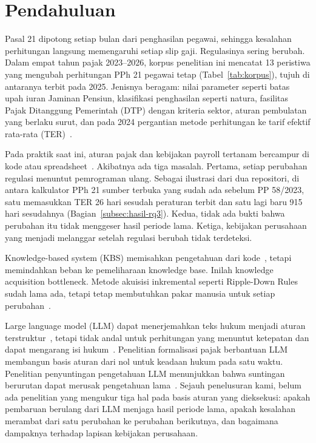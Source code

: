 \documentclass[journal,a4paper]{IEEEtran}
\makeatletter
\DeclareRobustCommand{\en}[1]{{\usefont{\f@encoding}{\f@family}{\f@series}{it}#1\/}}
\makeatother
\begin{document}
\section{Pendahuluan}
\label{sec:pendahuluan}
 Pasal 21 dipotong setiap bulan dari penghasilan pegawai, sehingga kesalahan perhitungan langsung memengaruhi setiap slip gaji. Regulasinya sering berubah. Dalam empat tahun pajak 2023--2026, korpus penelitian ini mencatat 13 peristiwa yang mengubah perhitungan PPh 21 pegawai tetap (Tabel~\ref{tab:korpus}), tujuh di antaranya terbit pada 2025. Jenisnya beragam: nilai parameter seperti batas upah iuran Jaminan Pensiun, klasifikasi penghasilan seperti natura, fasilitas Pajak Ditanggung Pemerintah (DTP) dengan kriteria sektor, aturan pembulatan yang berlaku surut, dan pada 2024 pergantian metode perhitungan ke tarif efektif rata-rata (TER)~\cite{pp58_2023,pmk168_2023}.

Pada praktik saat ini, aturan pajak dan kebijakan \en{payroll} tertanam bercampur di kode atau \en{spreadsheet}~\cite{ramadhani2021grossup,yulistyawati2022payroll,kusuma2026pph21}. Akibatnya ada tiga masalah. Pertama, setiap perubahan regulasi menuntut pemrograman ulang. Sebagai ilustrasi dari dua repositori, di antara kalkulator PPh 21 sumber terbuka yang sudah ada sebelum PP 58/2023, satu memasukkan TER 26 hari sesudah peraturan terbit dan satu lagi baru 915 hari sesudahnya (Bagian~\ref{subsec:hasil-rq3}). Kedua, tidak ada bukti bahwa perubahan itu tidak menggeser hasil periode lama. Ketiga, kebijakan perusahaan yang menjadi melanggar setelah regulasi berubah tidak terdeteksi.

\en{Knowledge-based system} (KBS) memisahkan pengetahuan dari kode~\cite{mowbray2023scaling,merigoux2021catala}, tetapi memindahkan beban ke pemeliharaan \en{knowledge base}. Inilah \en{knowledge acquisition bottleneck}. Metode akuisisi inkremental seperti \en{Ripple-Down Rules} sudah lama ada, tetapi tetap membutuhkan pakar manusia untuk setiap perubahan~\cite{compton2021rdr}.

\en{Large language model} (LLM) dapat menerjemahkan teks hukum menjadi aturan terstruktur~\cite{janatian2023texttostructure,makowski2025dmn}, tetapi tidak andal untuk perhitungan yang menuntut ketepatan dan dapat mengarang isi hukum~\cite{blairstanek2023gpt3,nay2024taxattorneys,dahl2024legalfictions}. Penelitian formalisasi pajak berbantuan LLM membangun basis aturan dari nol untuk keadaan hukum pada satu waktu. Penelitian penyuntingan pengetahuan LLM menunjukkan bahwa suntingan berurutan dapat merusak pengetahuan lama~\cite{gupta2024editing}. Sejauh penelusuran kami, belum ada penelitian yang mengukur tiga hal pada basis aturan yang dieksekusi: apakah pembaruan berulang dari LLM menjaga hasil periode lama, apakah kesalahan merambat dari satu perubahan ke perubahan berikutnya, dan bagaimana dampaknya terhadap lapisan kebijakan perusahaan.
\end{document}
